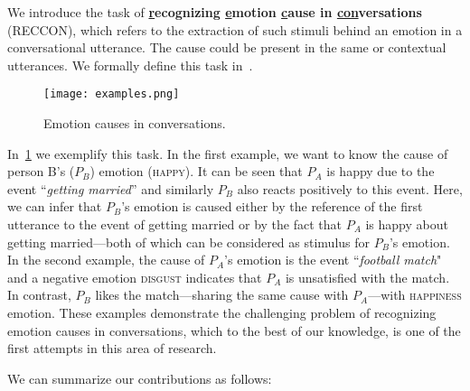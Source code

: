 \documentclass[smallextended]{svjour3}
\newcommand\emo[1]{\textsc{#1}}
\newcommand\0{\hphantom{0}}
\begin{document}
We introduce the task of \textbf{\underline{r}ecognizing \underline{e}motion \underline{c}ause in \underline{con}\-ver\-sa\-tions} (RECCON), which refers to the extraction of such stimuli behind an emotion in a conversational utterance. The cause could be present in the same or contextual utterances.
We formally define this task in~.

\begin{figure}[t] 
    \centering 
    \texttt{[image: examples.png]}
    \caption{Emotion causes in conversations.}
    \label{fig:examples}
\end{figure}

In~\cref{fig:examples} we exemplify this task. In the first example, we want to know the cause of person B's ($P_B$) emotion (\emo{happy}). It can be seen that $P_A$ is happy due to the event ``\textit{getting married}'' and similarly $P_B$ also reacts positively to this event. Here, we can infer that $P_B$'s emotion is caused either by the reference of the first utterance to the event of getting married or by the fact that $P_A$ is happy about getting married---both of which can be considered as stimulus for $P_B$'s emotion. In the second example, the cause of $P_A$'s emotion is the event ``\textit{football match}" and a negative emotion \emo{disgust} indicates that $P_A$ is unsatisfied 
with
the match. In contrast, $P_B$ 
likes
the match---sharing the same cause with $P_A$---with \emo{happiness} emotion. These examples demonstrate the challenging problem of recognizing emotion causes in conversations, which to the best of our knowledge, is one of the first attempts in this area of research.
































We can summarize our contributions as follows:
\end{document}
